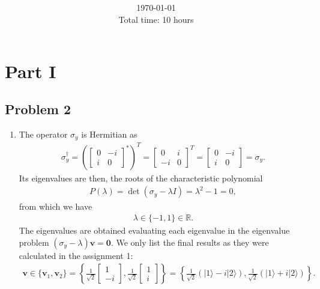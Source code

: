 \documentclass[letterpaper,11pt,twoside]{article}
\title{\textbf{\assignment}\\\course\\{\Large\institution}}
\author{\autor}
\date{\today\\Total time: 10 hours}
\newcommand{\ket}[1]{|#1\rangle}
\begin{document}
\pagestyle{mainstyle}
\maketitle
\section*{Part I}
\subsection*{Problem 2}
\begin{enumerate}[itemsep=0pt,topsep=0pt,label=\alph*.]
  \item The operator $\sigma_y$ is Hermitian as 
  \begin{align*}
    \sigma_y^\dagger=\left(\begin{bmatrix}
      0&-i\\i&0
    \end{bmatrix}^*\right)^T=\begin{bmatrix}
    0&i\\-i&0
  \end{bmatrix}^T=\begin{bmatrix}
    0&-i\\i&0
  \end{bmatrix}=\sigma_y.
  \end{align*}
  Its eigenvalues are then, the roots of the characteristic polynomial
  \begin{align*}
    P(\lambda)=\det(\sigma_y-\lambda I)=\lambda^2-1=0,
  \end{align*}
  from which we have 
  \begin{align}
    \lambda\in\{-1,1\}\in\mathbb{R}.
  \end{align}
  The eigenvalues are obtained evaluating each eigenvalue in the eigenvalue problem $(\sigma_y-\lambda)\bm{v}=\bm{0}$.
  We only list the final results as they were calculated in the assignment 1:
  \begin{align}
    \bm{v}\in\{\bm{v}_1,\bm{v}_2\}=\left\{\frac{1}{\sqrt{2}}\begin{bmatrix}
    1\\-i
    \end{bmatrix},\frac{1}{\sqrt{2}}\begin{bmatrix}
    1\\i
    \end{bmatrix}\right\}=\left\{\frac{1}{\sqrt{2}}(\ket{1}-i\ket{2}),\frac{1}{\sqrt{2}}(\ket{1}+i\ket{2})\right\}.
  \end{align}

\end{enumerate}
\end{document}
